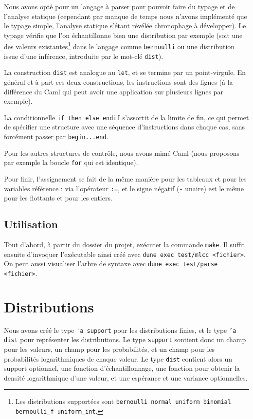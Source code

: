 \documentclass[svgnames]{article}
\begin{document}
Nous avons opté pour un langage à parser pour pouvoir faire du typage et de l'analyse statique (cependant par manque de temps nous n'avons implémenté que le typage simple, l'analyse statique s'étant révélée chronophage à développer).
Le typage vérifie que l'on échantillonne bien une distribution par exemple (soit une des valeurs existantes\footnote{Les distributions supportées sont \texttt{bernoulli normal uniform binomial bernoulli\_f uniform\_int}.} dans le langage comme \verb|bernoulli| ou une distribution issue d'une inférence, introduite par le mot-clé \lstinline{dist}).

La construction \lstinline{dist} est analogue au \lstinline{let}, et se termine par un point-virgule. En général et à part ces deux constructions, les instructions sont des lignes (à la différence du Caml qui peut avoir une application sur plusieurs lignes par exemple). 

La conditionnelle \lstinline{if then else endif} s'assortit de la limite de fin, ce qui permet de spécifier une structure avec une séquence d'instructions dans chaque cas, sans forcément passer par \lstinline{begin...end}.

Pour les autres structures de contrôle, nous avons mimé Caml (nous proposons par exemple la boucle \lstinline{for} qui est identique).

Pour finir, l'assignement se fait de la même manière pour les tableaux et pour les variables référence : via l'opérateur \verb|:=|, et le signe négatif (\verb|-| unaire) est le même pour les flottants et pour les entiers.

\subsection{Utilisation}

Tout d'abord, à partir du dossier du projet, exécuter la commande \verb|make|. Il suffit ensuite d'invoquer l'exécutable ainsi créé avec \verb|dune exec test/mlcc <fichier>|. On peut aussi visualiser l'arbre de syntaxe avec \verb|dune exec test/parse <fichier>|.

\section{Distributions}

Nous avons créé le type \verb|'a support| pour les distributions finies, et le type \texttt{'a dist} pour représenter les distributions. Le type \texttt{support} sontient donc un champ pour les valeurs, un champ pour les probabilités, et un champ pour les probabilités logarithmiques de chaque valeur. Le type \texttt{dist} contient alors un support optionnel, une fonction d'échantillonnage, une fonction pour obtenir la densité logarithmique d'une valeur, et une espérance et une variance optionnelles.
\end{document}
